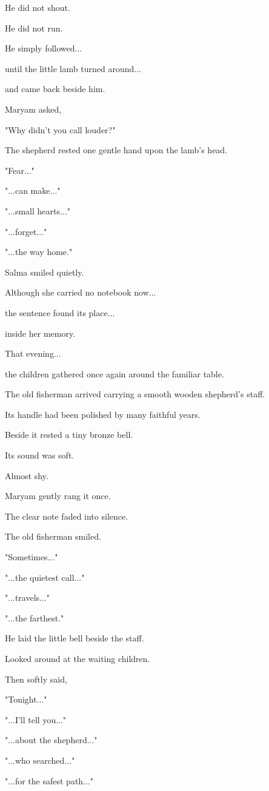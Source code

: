 \documentclass[12pt,openany]{book}
\begin{document}
He did not shout.

He did not run.

He simply followed...

until the little lamb turned around...

and came back beside him.

Maryam asked,

"Why didn't you call louder?"

The shepherd rested one gentle hand upon the lamb's head.

"Fear..."

"...can make..."

"...small hearts..."

"...forget..."

"...the way home."

Salma smiled quietly.

Although she carried no notebook now...

the sentence found its place...

inside her memory.

That evening...

the children gathered once again around the familiar table.

The old fisherman arrived carrying a smooth wooden shepherd's staff.

Its handle had been polished by many faithful years.

Beside it rested a tiny bronze bell.

Its sound was soft.

Almost shy.

Maryam gently rang it once.

The clear note faded into silence.

The old fisherman smiled.

"Sometimes..."

"...the quietest call..."

"...travels..."

"...the farthest."

He laid the little bell beside the staff.

Looked around at the waiting children.

Then softly said,

"Tonight..."

"...I'll tell you..."

"...about the shepherd..."

"...who searched..."

"...for the safest path..."
\end{document}

